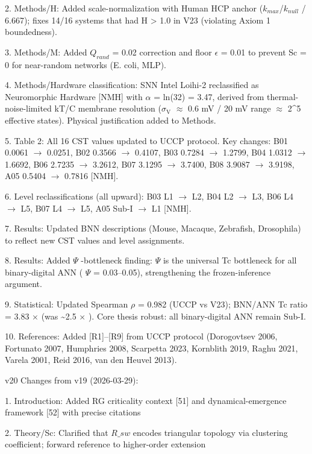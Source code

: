 \documentclass[a4paper,12pt]{article}
\begin{document}
2. Methods/H: Added scale-normalization with Human HCP anchor ($k_{max}$/$k_{null}$ / 6.667); fixes 14/16 systems that had H > 1.0 in V23 (violating Axiom 1 boundedness).

3. Methods/M: Added $Q_{rand}$ = 0.02 correction and floor $\epsilon$ = 0.01 to prevent Sc = 0 for near-random networks (E. coli, MLP).

4. Methods/Hardware classification: SNN Intel Loihi-2 reclassified as Neuromorphic Hardware [NMH] with  $\alpha$  = ln(32) = 3.47, derived from thermal-noise-limited kT/C membrane resolution ($\sigma_{\text{V}}$  $\approx$  0.6 mV / 20 mV range  $\approx$  2^5 effective states). Physical justification added to Methods.

5. Table 2: All 16 CST values updated to UCCP protocol. Key changes: B01 0.0061 $\rightarrow$ 0.0251, B02 0.3566 $\rightarrow$ 0.4107, B03 0.7284 $\rightarrow$ 1.2799, B04 1.0312 $\rightarrow$ 1.6692, B06 2.7235 $\rightarrow$ 3.2612, B07 3.1295 $\rightarrow$ 3.7400, B08 3.9087 $\rightarrow$ 3.9198, A05 0.5404 $\rightarrow$ 0.7816 [NMH].

6. Level reclassifications (all upward): B03 L1 $\rightarrow$ L2, B04 L2 $\rightarrow$ L3, B06 L4 $\rightarrow$ L5, B07 L4 $\rightarrow$ L5, A05 Sub-I $\rightarrow$ L1 [NMH].

7. Results: Updated BNN descriptions (Mouse, Macaque, Zebrafish, Drosophila) to reflect new CST values and level assignments.

8. Results: Added  $\Psi$ -bottleneck finding:  $\Psi$  is the universal Tc bottleneck for all binary-digital ANN ( $\Psi$  = 0.03--0.05), strengthening the frozen-inference argument.

9. Statistical: Updated Spearman  $\rho$  = 0.982 (UCCP vs V23); BNN/ANN Tc ratio = 3.83 $\times$  (was \textasciitilde{}2.5 $\times$ ). Core thesis robust: all binary-digital ANN remain Sub-I.

10. References: Added [R1]--[R9] from UCCP protocol (Dorogovtsev 2006, Fortunato 2007, Humphries 2008, Scarpetta 2023, Kornblith 2019, Raghu 2021, Varela 2001, Reid 2016, van den Heuvel 2013).

v20 Changes from v19 (2026-03-29):

1. Introduction: Added RG criticality context [51] and dynamical-emergence framework [52] with precise citations

2. Theory/Sc: Clarified that $R\_{sw}$ encodes triangular topology via clustering coefficient; forward reference to higher-order extension
\end{document}
